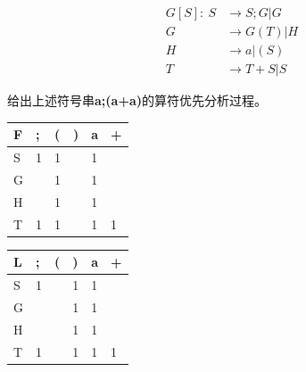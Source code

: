 \documentclass[UTF8]{ctexart} %
\begin{document}
\begin{equation}
    \begin{aligned}
        G[S]:\ S & \rightarrow S;G|G  \\
        G        & \rightarrow G(T)|H \\
        H        & \rightarrow a|(S)  \\
        T        & \rightarrow T+S|S
    \end{aligned}
\end{equation}

给出上述符号串\textbf{a;(a+a)}的算符优先分析过程。

\begin{table}[H]
    \centering
    \begin{tabular}{|p{2cm}<{\centering}|p{1cm}<{\centering}|p{1cm}<{\centering}|p{1cm}<{\centering}|p{1cm}<{\centering}|p{1cm}<{\centering}|}
        \hline
        F & ; & ( & ) & a & + \\
        \hline
        S & 1 & 1 &   & 1 &   \\
        G &   & 1 &   & 1 &   \\
        H &   & 1 &   & 1 &   \\
        T & 1 & 1 &   & 1 & 1
    \end{tabular}
\end{table}

\begin{table}[H]
    \centering
    \begin{tabular}{|p{2cm}<{\centering}|p{1cm}<{\centering}|p{1cm}<{\centering}|p{1cm}<{\centering}|p{1cm}<{\centering}|p{1cm}<{\centering}|}
        \hline
        L & ; & ( & ) & a & + \\
        \hline
        S & 1 &   & 1 & 1 &   \\
        G &   &   & 1 & 1 &   \\
        H &   &   & 1 & 1 &   \\
        T & 1 &   & 1 & 1 & 1
    \end{tabular}
\end{table}
\end{document}
